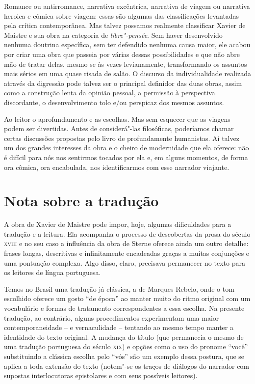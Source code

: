 Romance ou antirromance, narrativa excêntrica, narrativa de viagem ou
narrativa heroica e cômica sobre viagem: essas são algumas das
classificações levantadas pela crítica contemporânea. Mas talvez
possamos realmente classificar Xavier de Maistre e sua obra na
categoria de \textit{libre"-pensée}. Sem haver desenvolvido nenhuma
doutrina específica, sem ter defendido nenhuma causa maior, ele acabou
por criar uma obra que passeia por várias dessas possibilidades e que
não abre mão de tratar delas, mesmo se às vezes levianamente,
transformando os assuntos mais sérios em uma quase risada de salão.  O
discurso da individualidade realizada através da digressão pode talvez
ser o principal definidor das duas obras, assim como a construção lenta
da opinião pessoal, a permissão à perspectiva discordante, o
desenvolvimento tolo e/ou perspicaz dos mesmos assuntos. 

Ao leitor o aprofundamento e as escolhas. Mas sem esquecer que as
viagens podem ser divertidas. Antes de considerá"-las filosóficas,
poderíamos chamar certas discussões propostas pelo livro de
profundamente humanistas. Aí talvez um dos grandes interesses da obra e
o cheiro de modernidade que ela oferece: não é difícil para
nós nos sentirmos tocados por ela e, %
em alguns momentos, de forma ora cômica, ora encabulada, nos
identificarmos com esse narrador viajante.

\section{Nota sobre a tradução}

A obra de Xavier de Maistre pode impor, hoje, algumas dificuldades 
para a tradução e a leitura. Ela acompanha o processo de descobertas da 
prosa do século \textsc{xviii} e no seu caso a influência da obra de Sterne oferece 
ainda um outro detalhe: frases longas, descritivas e infinitamente encadeadas 
graças a muitas conjunções e uma pontuação complexa. Algo disso, claro, precisava 
permanecer no texto para os leitores de língua portuguesa.
	
Temos no Brasil uma tradução já clássica, a de Marques Rebelo, onde o tom escolhido 
oferece um gosto ``de época'' ao manter muito do ritmo original com um vocabulário e 
formas de tratamento correspondentes a essa escolha. Na presente tradução, ao contrário, 
alguns procedimentos experimentam uma maior contemporaneidade -- e vernaculidade -- tentando 
ao mesmo tempo manter a identidade do texto original. A mudança do título (que permanecia o 
mesmo de uma tradução portuguesa do século \textsc{xix}) e opções como o uso do pronome ``você'' 
substituindo a clássica escolha pelo ``vós'' são um exemplo dessa postura, que se aplica a 
toda extensão do texto (notem"-se os traços de diálogos do narrador com supostas interlocutoras 
epistolares e com seus possíveis leitores). 

